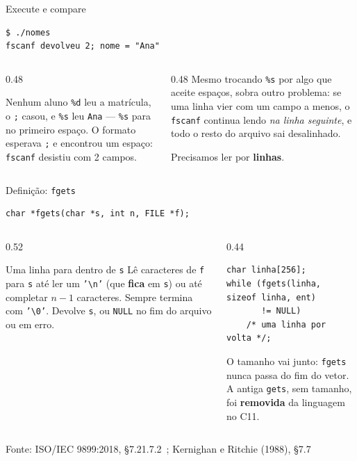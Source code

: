 \documentclass[aspectratio=169]{beamer}
\newcommand{\fonte}[1]{\vfill\hfill{\scriptsize\textcolor{UFSGray}{Fonte: #1}}}
\begin{document}
\begin{frame}[fragile]{Execute e compare}
\begin{lstlisting}[style=shellStyle]
$ ./nomes
fscanf devolveu 2; nome = "Ana"
\end{lstlisting}
  \begin{columns}[T]
    \begin{column}{0.48\textwidth}
      \begin{block}{Nenhum aluno}
        \small \texttt{\%d} leu a matrícula, o \texttt{;} casou, e
        \texttt{\%s} leu \texttt{Ana} --- \texttt{\%s} para no primeiro
        espaço. O formato esperava \texttt{;} e encontrou um espaço:
        \texttt{fscanf} desistiu com 2 campos.
      \end{block}
    \end{column}
    \begin{column}{0.48\textwidth}
      \small Mesmo trocando \texttt{\%s} por algo que aceite espaços, sobra
      outro problema: se uma linha vier com um campo a menos, o
      \texttt{fscanf} continua lendo \emph{na linha seguinte}, e todo o
      resto do arquivo sai desalinhado.

      \medskip
      Precisamos ler por \textbf{linhas}.
    \end{column}
  \end{columns}
\end{frame}

\begin{frame}[fragile]{Definição: \texttt{fgets}}
  \vspace{-0.3em}
\begin{lstlisting}[style=codC]
char *fgets(char *s, int n, FILE *f);
\end{lstlisting}
  \begin{columns}[T]
    \begin{column}{0.52\textwidth}
      \begin{block}{Uma linha para dentro de \texttt{s}}
        \small Lê caracteres de \texttt{f} para \texttt{s} até ler um
        \texttt{'\textbackslash n'} (que \textbf{fica} em \texttt{s}) ou até
        completar $n-1$ caracteres. Sempre termina com
        \texttt{'\textbackslash 0'}. Devolve \texttt{s}, ou \texttt{NULL}
        no fim do arquivo ou em erro.
      \end{block}
    \end{column}
    \begin{column}{0.44\textwidth}
\begin{lstlisting}[style=codC]
char linha[256];
while (fgets(linha, sizeof linha, ent)
       != NULL)
    /* uma linha por volta */;
\end{lstlisting}
      \small O tamanho vai junto: \texttt{fgets} nunca passa do fim do vetor.
      A antiga \texttt{gets}, sem tamanho, foi \textbf{removida} da
      linguagem no C11.
    \end{column}
  \end{columns}
  \fonte{ISO/IEC 9899:2018, §7.21.7.2~\cite{iso2018c17};
    Kernighan e Ritchie (1988), §7.7~\cite{kernighan1988c}}
\end{frame}
\end{document}
